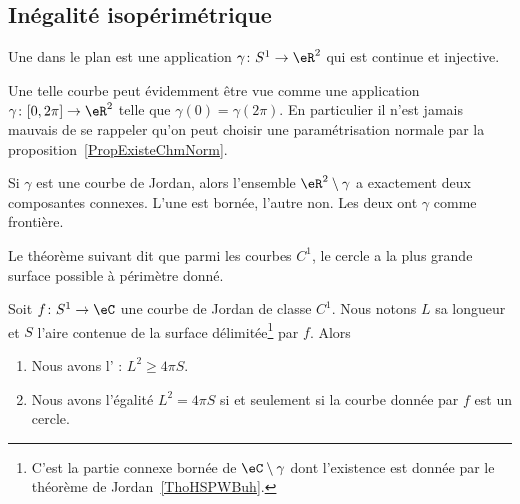 
\subsection{Inégalité isopérimétrique}

\begin{definition}
    Une  dans le plan est une application \( \gamma\colon S^1\to \eR^2\) qui est continue et injective.
\end{definition}
Une telle courbe peut évidemment être vue comme une application \( \gamma\colon \mathopen[ 0 , 2\pi ]\to \eR^2\) telle que \( \gamma(0)=\gamma(2\pi)\). En particulier il n'est jamais mauvais de se rappeler qu'on peut choisir une paramétrisation normale par la proposition~\ref{PropExisteChmNorm}.

\begin{theorem}   \label{ThoHSPWBuh}
    Si \( \gamma\) est une courbe de Jordan, alors l'ensemble \( \eR^2\setminus \gamma\) a exactement deux composantes connexes. L'une est bornée, l'autre non. Les deux ont \( \gamma\) comme frontière.
\end{theorem}

Le théorème suivant dit que parmi les courbes \( C^1\), le cercle a la plus grande surface possible à périmètre donné.
\begin{theorem}    \label{ThoIXyctPo}
    Soit \( f\colon S^1\to \eC \) une courbe de Jordan de classe \( C^1\). Nous notons \( L\) sa longueur et \( S\) l'aire contenue de la surface délimitée\footnote{C'est la partie connexe bornée de \( \eC\setminus\gamma\) dont l'existence est donnée par le théorème de Jordan~\ref{ThoHSPWBuh}.} par \( f\). Alors
    \begin{enumerate}
        \item
            Nous avons l' : \( L^2\geq 4\pi S\).
        \item
            Nous avons l'égalité \( L^2=4\pi S\) si et seulement si la courbe donnée par \( f\) est un cercle.
    \end{enumerate}
\end{theorem}

